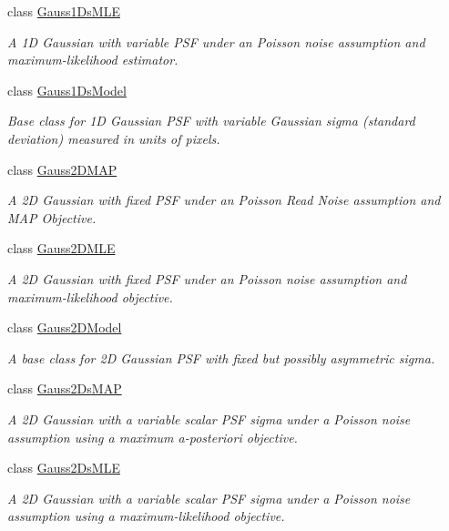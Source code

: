 \begin{DoxyCompactItemize}
class \hyperlink{classmappel_1_1Gauss1DsMLE}{Gauss1\+Ds\+M\+LE}
\begin{DoxyCompactList}\small\item\em A 1D Gaussian with variable P\+SF under an Poisson noise assumption and maximum-\/likelihood estimator. \end{DoxyCompactList}\item 
class \hyperlink{classmappel_1_1Gauss1DsModel}{Gauss1\+Ds\+Model}
\begin{DoxyCompactList}\small\item\em Base class for 1D Gaussian P\+SF with variable Gaussian sigma (standard deviation) measured in units of pixels. \end{DoxyCompactList}\item 
class \hyperlink{classmappel_1_1Gauss2DMAP}{Gauss2\+D\+M\+AP}
\begin{DoxyCompactList}\small\item\em A 2D Gaussian with fixed P\+SF under an Poisson Read Noise assumption and M\+AP Objective. \end{DoxyCompactList}\item 
class \hyperlink{classmappel_1_1Gauss2DMLE}{Gauss2\+D\+M\+LE}
\begin{DoxyCompactList}\small\item\em A 2D Gaussian with fixed P\+SF under an Poisson noise assumption and maximum-\/likelihood objective. \end{DoxyCompactList}\item 
class \hyperlink{classmappel_1_1Gauss2DModel}{Gauss2\+D\+Model}
\begin{DoxyCompactList}\small\item\em A base class for 2D Gaussian P\+SF with fixed but possibly asymmetric sigma. \end{DoxyCompactList}\item 
class \hyperlink{classmappel_1_1Gauss2DsMAP}{Gauss2\+Ds\+M\+AP}
\begin{DoxyCompactList}\small\item\em A 2D Gaussian with a variable scalar P\+SF sigma under a Poisson noise assumption using a maximum a-\/posteriori objective. \end{DoxyCompactList}\item 
class \hyperlink{classmappel_1_1Gauss2DsMLE}{Gauss2\+Ds\+M\+LE}
\begin{DoxyCompactList}\small\item\em A 2D Gaussian with a variable scalar P\+SF sigma under a Poisson noise assumption using a maximum-\/likelihood objective. \end{DoxyCompactList}\item 

\end{DoxyCompactItemize}
